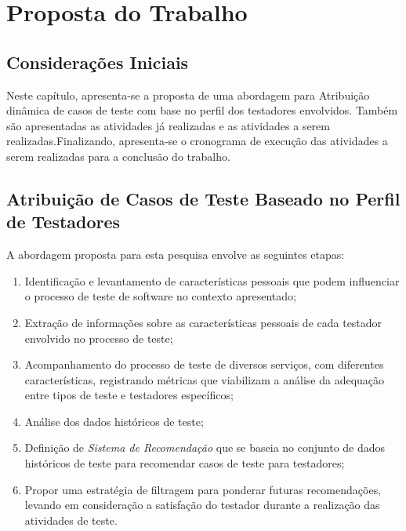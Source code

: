 \chapter{Proposta do Trabalho}
\label{ch:proposta}

\section{Considerações Iniciais}

Neste capítulo, apresenta-se a proposta de uma abordagem para Atribuição dinâmica de casos de teste com base no perfil dos testadores envolvidos. Também são apresentadas as atividades já realizadas e as atividades a serem realizadas.Finalizando, apresenta-se o cronograma de execução das atividades a serem realizadas para a conclusão do trabalho.

\section{Atribuição de Casos de Teste Baseado no Perfil de Testadores}

A abordagem proposta para esta pesquisa envolve as seguintes etapas:

\begin{enumerate}
    \item Identificação e levantamento de características pessoais que podem influenciar o processo de teste de software no contexto apresentado;

    \item Extração de informações sobre as características pessoais de cada testador envolvido no processo de teste;

    \item Acompanhamento do processo de teste de diversos serviços, com diferentes características, registrando métricas que viabilizam a análise da adequação entre tipos de teste e testadores específicos;

    \item Análise dos dados históricos de teste;

    \item Definição de \textit{Sistema de Recomendação} que se baseia no conjunto de dados históricos de teste para recomendar casos de teste para testadores;

    \item Propor uma estratégia de filtragem para ponderar futuras recomendações, levando em consideração a satisfação do testador durante a realização das atividades de teste.
\end{enumerate}


